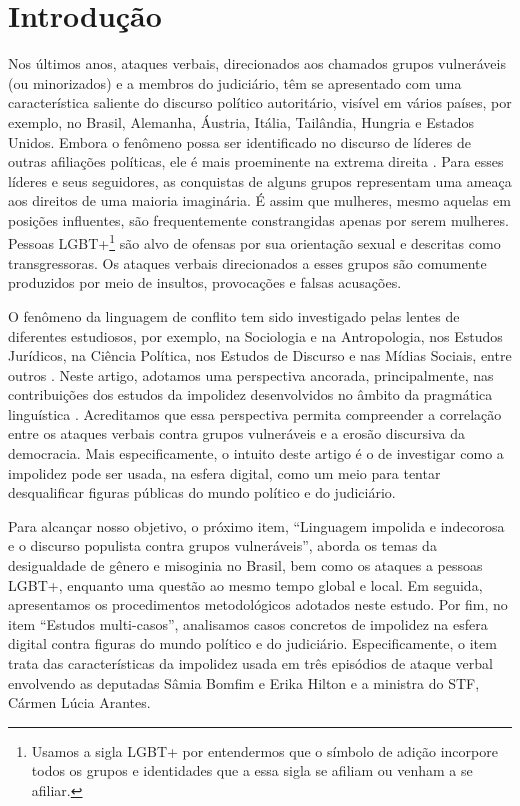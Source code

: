 \documentclass[portuguese]{textolivre}
\begin{document}
\begin{polyabstract}
\begin{english}
\begin{abstract}
\end{abstract}
\end{english}
\end{polyabstract}

\section{Introdução}\label{sec-intro}
Nos últimos anos, ataques verbais, direcionados aos chamados grupos vulneráveis (ou minorizados) e a membros do judiciário, têm se apresentado com uma característica saliente do discurso político autoritário, visível em vários países, por exemplo, no Brasil, Alemanha, Áustria, Itália, Tailândia, Hungria e Estados Unidos. Embora o fenômeno possa ser identificado no discurso de líderes de outras afiliações políticas, ele é mais proeminente na extrema direita \cite{drinoczi-agnieska2022}. Para esses líderes e seus seguidores, as conquistas de alguns grupos representam uma ameaça aos direitos de uma maioria imaginária. É assim que mulheres, mesmo aquelas em posições influentes, são frequentemente constrangidas apenas por serem mulheres. Pessoas LGBT+\footnote{Usamos a sigla LGBT+ por entendermos que o símbolo de adição incorpore todos os grupos e identidades que a essa sigla se afiliam ou venham a se afiliar.} são alvo de ofensas por sua orientação sexual e descritas como transgressoras. Os ataques verbais direcionados a esses grupos são comumente produzidos por meio de insultos, provocações e falsas acusações.

O fenômeno da linguagem de conflito tem sido investigado pelas lentes de diferentes estudiosos, por exemplo, na Sociologia e na Antropologia, nos Estudos Jurídicos, na Ciência Política, nos Estudos de Discurso e nas Mídias Sociais, entre outros \cite{oliveira2024}. Neste artigo, adotamos uma perspectiva ancorada, principalmente, nas contribuições dos estudos da impolidez desenvolvidos no âmbito da pragmática linguística \cite{culpeper2010, culpeper2011}. Acreditamos que essa perspectiva permita compreender a correlação entre os ataques verbais contra grupos vulneráveis e a erosão discursiva da democracia. Mais especificamente, o intuito deste artigo é o de investigar como a impolidez pode ser usada, na esfera digital, como um meio para tentar desqualificar figuras públicas do mundo político e do judiciário.

Para alcançar nosso objetivo, o próximo item, “Linguagem impolida e indecorosa e o discurso populista contra grupos vulneráveis”, aborda os temas da desigualdade de gênero e misoginia no Brasil, bem como os ataques a pessoas LGBT+, enquanto uma questão ao mesmo tempo global e local. Em seguida, apresentamos os procedimentos metodológicos adotados neste estudo. Por fim, no item “Estudos multi-casos”, analisamos casos concretos de impolidez na esfera digital contra figuras do mundo político e do judiciário. Especificamente, o item trata das características da impolidez usada em três episódios de ataque verbal envolvendo as deputadas Sâmia Bomfim e Erika Hilton e a ministra do STF, Cármen Lúcia Arantes.
\end{document}
